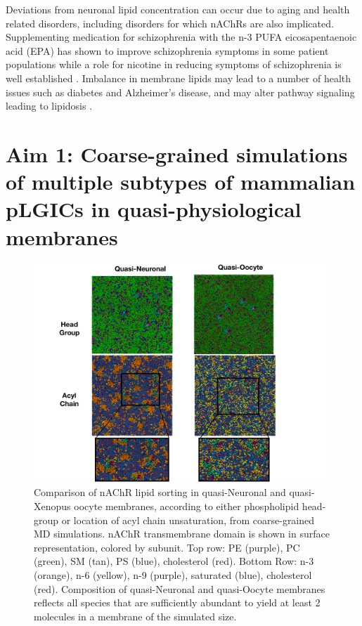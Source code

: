 \documentclass{article}
\begin{document}
Deviations from neuronal lipid concentration can occur due to aging and health related disorders, including disorders for which nAChRs are also implicated. Supplementing medication for schizophrenia with the n-3 PUFA eicosapentaenoic acid (EPA) has shown to improve schizophrenia symptoms in some patient populations \cite{Peet2003,Freemantle2006,Su2003} while a role for nicotine in reducing symptoms of schizophrenia is well established \cite{Picciotto2008}. Imbalance in membrane lipids may lead to a number of health issues such as diabetes and Alzheimer’s disease, and may alter pathway signaling leading to lipidosis \cite{Escriba2017,Laforet2010,Yadav2014}.

\section{Aim 1: Coarse-grained simulations of multiple subtypes of mammalian pLGICs in quasi-physiological membranes}
\begin{figure}[t!]\center
	\includegraphics[width=11cm]{./F31/Memb_Comp.pdf}
	\caption{Comparison of nAChR lipid sorting in quasi-Neuronal and quasi-Xenopus oocyte membranes, according to either phospholipid head-group or location of acyl chain unsaturation, from coarse-grained MD simulations. nAChR transmembrane domain is shown in surface representation, colored by subunit. Top row: PE (purple), PC (green), SM (tan), PS (blue), cholesterol (red). Bottom Row: n-3 (orange), n-6 (yellow), n-9 (purple), saturated (blue), cholesterol (red). Composition of quasi-Neuronal and quasi-Oocyte membranes reflects all species that are sufficiently abundant to yield at least 2 molecules in a membrane of the simulated size.}
	\label{fig:ooct}
\end{figure}
\end{document}
